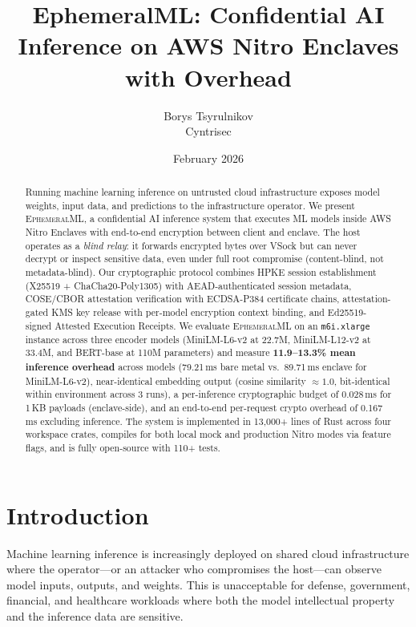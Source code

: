 \documentclass[11pt,a4paper]{article}
\title{\textbf{EphemeralML: Confidential AI Inference on AWS Nitro Enclaves\\with \BenchOverheadRange{} Overhead}}
\author{Borys Tsyrulnikov\\Cyntrisec}
\date{February 2026}
\newcommand{\BenchInstance}{m6i.xlarge}
\newcommand{\BenchModelName}{MiniLM-L6-v2}
\newcommand{\BenchModelParams}{22.7M}
\newcommand{\BenchNumRuns}{3}
\newcommand{\BenchBareMeanMs}{79.21}
\newcommand{\BenchEnclaveMeanMs}{89.71}
\newcommand{\ModelLTwelveParams}{33.4M}
\newcommand{\ModelBertBaseParams}{110M}
\newcommand{\BenchOverheadRange}{11.9--13.3\%}
\begin{document}
\maketitle

\begin{abstract}
Running machine learning inference on untrusted cloud infrastructure exposes model weights, input data, and predictions to the infrastructure operator.
We present \textsc{EphemeralML}, a confidential AI inference system that executes ML models inside AWS Nitro Enclaves with end-to-end encryption between client and enclave.
The host operates as a \emph{blind relay}: it forwards encrypted bytes over VSock but can never decrypt or inspect sensitive data, even under full root compromise (content-blind, not metadata-blind).
Our cryptographic protocol combines HPKE session establishment (X25519 + ChaCha20-Poly1305) with AEAD-authenticated session metadata, COSE\slash CBOR attestation verification with ECDSA-P384 certificate chains, attestation-gated KMS key release with per-model encryption context binding, and Ed25519-signed Attested Execution Receipts.
We evaluate \textsc{EphemeralML} on an \texttt{\BenchInstance{}} instance across three encoder models (\BenchModelName{} at \BenchModelParams{}, MiniLM-L12-v2 at \ModelLTwelveParams{}, and BERT-base at \ModelBertBaseParams{} parameters) and measure \textbf{\BenchOverheadRange{} mean inference overhead} across models (\BenchBareMeanMs{}\,ms bare metal vs.\ \BenchEnclaveMeanMs{}\,ms enclave for \BenchModelName{}), near-identical embedding output (cosine similarity $\approx 1.0$, bit-identical within environment across \BenchNumRuns{} runs), a per-inference cryptographic budget of 0.028\,ms for 1\,KB payloads (enclave-side), and an end-to-end per-request crypto overhead of 0.167\,ms excluding inference.
The system is implemented in 13,000+ lines of Rust across four workspace crates, compiles for both local mock and production Nitro modes via feature flags, and is fully open-source with 110+ tests.
\end{abstract}

\section{Introduction}
\label{sec:introduction}

Machine learning inference is increasingly deployed on shared cloud infrastructure where the operator---or an attacker who compromises the host---can observe model inputs, outputs, and weights.
This is unacceptable for defense, government, financial, and healthcare workloads where both the model intellectual property and the inference data are sensitive.
\end{document}
